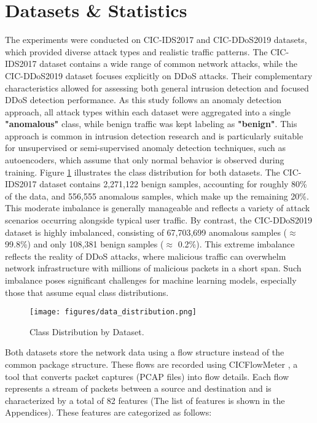 \section{Datasets \& Statistics}

The experiments were conducted on CIC-IDS2017 and CIC-DDoS2019 datasets, which provided diverse attack types and realistic traffic patterns. The CIC-IDS2017 dataset contains a wide range of common network attacks, while the CIC-DDoS2019 dataset focuses explicitly on DDoS attacks. Their complementary characteristics allowed for assessing both general intrusion detection and focused DDoS detection performance. As this study follows an anomaly detection approach, all attack types within each dataset were aggregated into a single \textbf{"anomalous" } class, while benign traffic was kept labeling as \textbf{"benign"}. This approach is common in intrusion detection research and is particularly suitable for unsupervised or semi-supervised anomaly detection techniques, such as autoencoders, which assume that only normal behavior is observed during training. Figure \ref{fig:data_distribution} illustrates the class distribution for both datasets. The CIC-IDS2017 dataset contains 2,271,122 benign samples, accounting for roughly 80\% of the data, and 556,555 anomalous samples, which make up the remaining 20\%. This moderate imbalance is generally manageable and reflects a variety of attack scenarios occurring alongside typical user traffic. By contrast, the CIC-DDoS2019 dataset is highly imbalanced, consisting of 67,703,699 anomalous samples ($\approx$ 99.8\%) and only 108,381 benign samples ($\approx$ 0.2\%). This extreme imbalance reflects the reality of DDoS attacks, where malicious traffic can overwhelm network infrastructure with millions of malicious packets in a short span. Such imbalance poses significant challenges for machine learning models, especially those that assume equal class distributions.

\begin{figure}[h]
    \centering
    \texttt{[image: figures/data\_distribution.png]}
    \caption{Class Distribution by Dataset.}
    \label{fig:data_distribution}
\end{figure}

Both datasets store the network data using a flow structure instead of the common package structure. These flows are recorded using CICFlowMeter \citep{cicflowmeter}, a tool that converts packet captures (PCAP files) into flow details. Each flow represents a stream of packets between a source and destination and is characterized by a total of 82 features (The list of features is shown in the Appendices). These features are categorized as follows:

